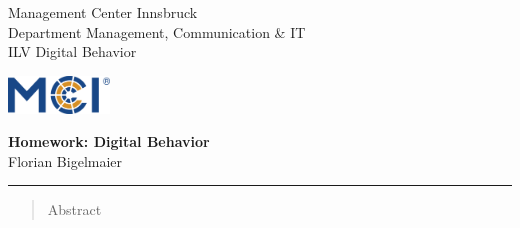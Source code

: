 \documentclass[11pt,letterpaper]{article}
\newcommand{\fontsmall}{\fontsize{7pt}{10pt}\selectfont}
\begin{document}
    



\noindent\begin{minipage}{0.5\textwidth}
\fontsmall
Management Center Innsbruck \\
Department Management, Communication \& IT  \\
ILV Digital Behavior


\end{minipage}%
\hfill%
\begin{minipage}{0.3\textwidth}\raggedleft
\includegraphics[height=1.0cm]{mci-logo.png}

\end{minipage}


 
\begin{center}
\textbf{\large Homework: Digital Behavior}\\   %
Florian Bigelmaier\\                         %
\end{center}
\rule{\linewidth}{0.1mm}




\begin{abstract}
    \noindent
Abstract
\end{abstract}
\end{document}
